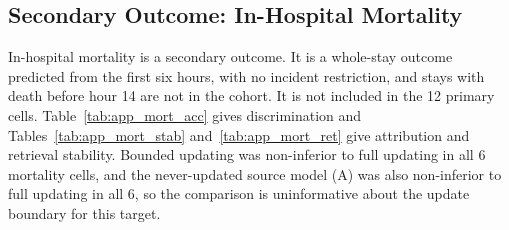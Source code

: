 \documentclass[10pt,a4paper,twocolumn]{article}
\begin{document}
	\subsection{Secondary Outcome: In-Hospital Mortality}
	\label{sec:app_mortality}
	In-hospital mortality is a secondary outcome. It is a whole-stay outcome predicted from the first six hours, with no incident restriction, and stays with death before hour 14 are not in the cohort. It is not included in the 12 primary cells. Table~\ref{tab:app_mort_acc} gives discrimination and Tables~\ref{tab:app_mort_stab} and~\ref{tab:app_mort_ret} give attribution and retrieval stability. Bounded updating was non-inferior to full updating in all 6 mortality cells, and the never-updated source model (A) was also non-inferior to full updating in all 6, so the comparison is uninformative about the update boundary for this target.
	
	\begin{table}[!ht]
		\centering
		\caption{Mortality: AUROC (mean of 5 seeds) and paired differences. Margin $= 0.015$ AUROC. Conventions as in Table~\ref{tab:accuracy}.}
		\label{tab:app_mort_acc}
		\scriptsize
	\end{table}
	
\end{document}
